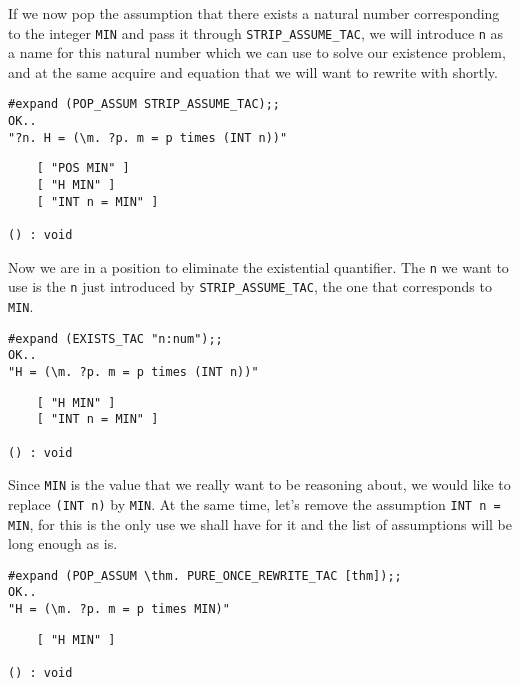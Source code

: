 If we now pop the assumption that there exists a natural number
corresponding to the integer {\small\verb+MIN+} and pass it through
{\small\verb+STRIP_ASSUME_TAC+}, we will introduce {\small\tt n} as a
name for this natural number which we can use to solve our existence
problem, and at the same acquire and equation that we will want to
rewrite with shortly. 
\begin{session}
\begin{verbatim}
#expand (POP_ASSUM STRIP_ASSUME_TAC);;
OK..
"?n. H = (\m. ?p. m = p times (INT n))"
\end{verbatim}
\mvdots
\begin{verbatim}
    [ "POS MIN" ]
    [ "H MIN" ]
    [ "INT n = MIN" ]

() : void
\end{verbatim}
\end{session}

Now we are in a position to eliminate the existential quantifier.  The
{\small\tt n} we want to use is the {\small\tt n} just introduced by
{\small\verb+STRIP_ASSUME_TAC+}, the one that corresponds to
{\small\verb+MIN+}.
\begin{session}
\begin{verbatim}
#expand (EXISTS_TAC "n:num");;
OK..
"H = (\m. ?p. m = p times (INT n))"
\end{verbatim}
\mvdots
\begin{verbatim}
    [ "H MIN" ]
    [ "INT n = MIN" ]

() : void
\end{verbatim}
\end{session}

Since {\small\verb+MIN+} is the value that we really want to be
reasoning about, we would like to replace {\small\verb+(INT n)+} by
{\small\verb+MIN+}.  At the same time, let's remove the assumption
{\small\verb+INT n = MIN+}, for this is the only use we shall have for
it and the list of assumptions will be long enough as is. 
\begin{session}
\begin{verbatim}
#expand (POP_ASSUM \thm. PURE_ONCE_REWRITE_TAC [thm]);;
OK..
"H = (\m. ?p. m = p times MIN)"
\end{verbatim}
\mvdots
\begin{verbatim}
    [ "H MIN" ]

() : void
\end{verbatim}
\end{session}

